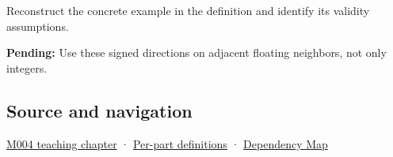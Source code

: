 Reconstruct the concrete example in the definition and identify its validity assumptions.

\textbf{Pending:} Use these signed directions on adjacent floating neighbors, not only integers.

\subsection{Source and navigation}\label{appendix-637d164ae5ca-source-and-navigation}

\hyperref[01-foundations-i-ch001-a-stretching-ruler-for-real-valued-quantities]{M004 teaching chapter} · \hyperref[appendix-fd090d982a15-m004---parts-61-76]{Per-part definitions} · \hyperref[appendix-4ad47bdd269a]{Dependency Map}
